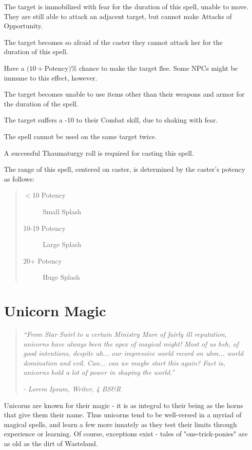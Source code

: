 \documentclass[11pt,a4paper,twocolumn]{book}
\begin{document}
\begin{compactitem}
	\item The target is immobilized with fear for the duration of this spell, unable to move. They are still able to attack an adjacent target, but cannot make Attacks of Opportunity.
	\item The target becomes so afraid of the caster they cannot attack her for the duration of this spell.
	\item Have a $(10 + $Potency$)\%$ chance to make the target flee. Some NPCs might be immune to this effect, however.
	\item The target becomes unable to use items other than their weapons and armor for the duration of the spell.
	\item The target suffers a -10 to their Combat skill, due to shaking with fear.
\end{compactitem}
\smallskip{}

The spell cannot be used on the same target twice.

A successful Thaumaturgy roll is required for casting this spell.

The range of this spell, centered on caster, is determined by the caster's potency as follows:
\begin{quote}
	\begin{description}
		\item[$<$10 Potency] 	Small Splash
		\item[10-19 Potency] 	Large Splash
		\item[20+ Potency] 	Huge Splash
	\end{description}	
\end{quote}   

\chapter{Unicorn Magic}

\begin{quote}
	\emph{``From Star Swirl to a certain Ministry Mare of fairly ill reputation, unicorns have always been the apex of magical might! Most of us heh, of good intentions, despite uh... our impressive world record on uhm... world domination and evil. Can... can we maybe start this again? Fact is, unicorns hold a lot of power in shaping the world.''}
	
	\emph{- Lorem Ipsum, Writer, 4 BS\&R}
\end{quote}

Unicorns are known for their magic - it is as integral to their being as the horns that give them their name. Thus unicorns tend to be well-versed in a myriad of magical spells, and learn a few more innately as they test their limits through experience or learning. Of course, exceptions exist - tales of "one-trick-ponies" are as old as the dirt of Wasteland.
\end{document}
